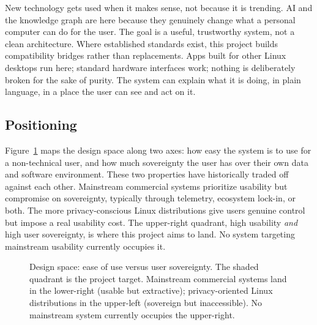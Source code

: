 New technology gets used when it makes sense, not because it is trending. AI
and the knowledge graph are here because they genuinely change what a personal
computer can do for the user. The goal is a useful, trustworthy system, not a
clean architecture. Where established standards exist, this project builds
compatibility bridges rather than replacements. Apps built for other Linux
desktops run here; standard hardware interfaces work; nothing is deliberately
broken for the sake of purity. The system can explain what it is doing, in
plain language, in a place the user can see and act on it.

\subsection{Positioning}
\label{sec:positioning}

Figure~\ref{fig:positioning} maps the design space along two axes: how easy
the system is to use for a non-technical user, and how much sovereignty the
user has over their own data and software environment. These two properties
have historically traded off against each other. Mainstream commercial systems
prioritize usability but compromise on sovereignty, typically through telemetry,
ecosystem lock-in, or both. The more privacy-conscious Linux distributions give
users genuine control but impose a real usability cost. The upper-right
quadrant, high usability \emph{and} high user sovereignty, is where this
project aims to land. No system targeting mainstream usability currently occupies it.

\begin{figure}[htbp]
\centering
{}
\caption{Design space: ease of use versus user sovereignty. The shaded quadrant
is the project target. Mainstream commercial systems land in the lower-right
(usable but extractive); privacy-oriented Linux distributions in the upper-left
(sovereign but inaccessible). No mainstream system currently occupies the
upper-right.}
\label{fig:positioning}
\end{figure}

